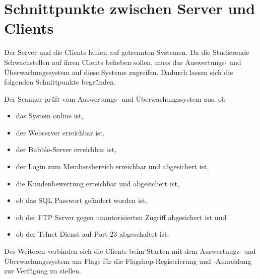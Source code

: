 \section{Schnittpunkte zwischen Server und Clients}
\label{sec:Schnittpunkte_zwischen_Server_und_Clients}

Der Server und die Clients laufen auf getrennten Systemen. Da die Studierende Schwachstellen auf ihren Clients beheben sollen, muss das Auswertungs- und Überwachungssystem auf diese Systeme zugreifen. Dadurch lassen sich die folgenden Schnittpunkte begründen.

Der Scanner prüft vom Auswertungs- und Überwachungssystem aus, ob 
\begin{itemize}
	\item das System online ist,
	\item der Webserver erreichbar ist,
	\item der Bubble-Server erreichbar ist,
	\item der Login zum Membersbereich erreichbar und abgesichert ist,
	\item die Kundenbewertung erreichbar und abgesichert ist,
	\item ob das SQL Passwort geändert worden ist,
	\item ob der FTP Server gegen unautorisierten Zugriff abgesichert ist und
	\item ob der Telnet Dienst auf Port 23 abgeschaltet ist. 
\end{itemize}

Des Weiteren verbinden sich die Clients beim Starten mit dem Auswertungs- und Überwachungssystem um Flags für die Flagshop-Registrierung und -Anmeldung zur Verfügung zu stellen.